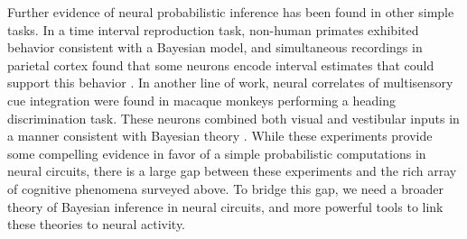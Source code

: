 Further evidence of neural probabilistic inference has been found in
other simple tasks. In a time interval reproduction task, non-human
primates exhibited behavior consistent with a Bayesian model, and
simultaneous recordings in parietal cortex found that some neurons
encode interval estimates that could support this behavior
\cite{jazayeri2015neural}. In another line of work, neural correlates
of multisensory cue integration were found in macaque monkeys
performing a heading discrimination task. These neurons combined both
visual and vestibular inputs in a manner consistent with Bayesian
theory \cite{gu2008neural, morgan2008multisensory, fetsch2009dynamic,
  fetsch2012neural}.  While these experiments provide some compelling
evidence in favor of a simple probabilistic computations in neural
circuits, there is a large gap between these experiments and the rich
array of cognitive phenomena surveyed above. To bridge this gap, we
need a broader theory of Bayesian inference in neural circuits, and
more powerful tools to link these theories to neural activity.

